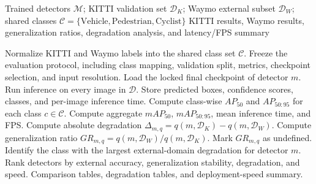 
\begin{algorithm}[t]
\caption{Unified Cross-Dataset Generalization Evaluation}
\label{alg:cross_dataset_generalization}
\small
\begin{algorithmic}[1]
\REQUIRE Trained detectors $\mathcal{M}$; KITTI validation set $\mathcal{D}_{K}$; Waymo external subset $\mathcal{D}_{W}$; shared classes $\mathcal{C}=\{\mathrm{Vehicle},\mathrm{Pedestrian},\mathrm{Cyclist}\}$
\ENSURE KITTI results, Waymo results, generalization ratios, degradation analysis, and latency/FPS summary

\STATE Normalize KITTI and Waymo labels into the shared class set $\mathcal{C}$.
\STATE Freeze the evaluation protocol, including class mapping, validation split, metrics, checkpoint selection, and input resolution.
    \STATE Load the locked final checkpoint of detector $m$.
        \STATE Run inference on every image in $\mathcal{D}$.
        \STATE Store predicted boxes, confidence scores, classes, and per-image inference time.
        \STATE Compute class-wise $AP_{50}$ and $AP_{50:95}$ for each class $c \in \mathcal{C}$.
        \STATE Compute aggregate $mAP_{50}$, $mAP_{50:95}$, mean inference time, and FPS.
    \ENDFOR
        \STATE Compute absolute degradation $\Delta_{m,q}=q(m,\mathcal{D}_{K})-q(m,\mathcal{D}_{W})$.
            \STATE Compute generalization ratio $GR_{m,q}=q(m,\mathcal{D}_{W})/q(m,\mathcal{D}_{K})$.
        \ELSE
            \STATE Mark $GR_{m,q}$ as undefined.
        \ENDIF
    \ENDFOR
    \STATE Identify the class with the largest external-domain degradation for detector $m$.
\ENDFOR
\STATE Rank detectors by external accuracy, generalization stability, degradation, and speed.
\RETURN Comparison tables, degradation tables, and deployment-speed summary.
\end{algorithmic}
\end{algorithm}



